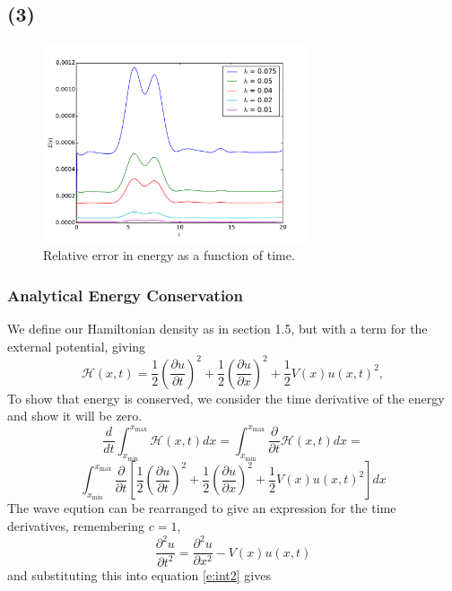 \documentclass[10pt]{article}
\begin{document}
\clearpage
\subsection*{(3)}

\begin{figure}
  \centering
  \includegraphics[width=0.7\textwidth]{2/En.pdf}
  \caption{Relative error in energy as a function of time.}
  \label{f:eerr}
\end{figure}

\subsubsection*{Analytical Energy Conservation}
We define our Hamiltonian density as in section 1.5, but with
a term for the external potential, giving
\begin{equation}
\mathcal{H}(x,t) = \frac{1}{2}\left(\frac{\partial u}{\partial t}\right)^2
+\frac{1}{2}\left(\frac{\partial u}{\partial x}\right)^2 +\frac{1}{2}V(x)u(x,t)^2,
\label{e:ham}
\end{equation}
To show that energy is conserved, we consider the time derivative of the energy and show it
will be zero.
$$ \frac{d}{dt} \int_{x_\text{min}}^{x_\text{max}} \mathcal{H}(x,t)dx =
\int_{x_\text{min}}^{x_\text{max}} \frac{\partial}{\partial t}\mathcal{H}(x,t)dx = $$
\begin{equation}
\int_{x_\text{min}}^{x_\text{max}} \frac{\partial}{\partial t} \left[
\frac{1}{2}\left(\frac{\partial u}{\partial t}\right)^2
+\frac{1}{2}\left(\frac{\partial u}{\partial x}\right)^2 +\frac{1}{2}V(x)u(x,t)^2\right] dx
\label{e:int1}
\end{equation}
The wave eqution can be rearranged to give an expression for the time derivatives, remembering $c=1$,
$$ \frac{\partial^2 u}{\partial t^2} = \frac{\partial^2 u}{\partial x^2} - V(x)u(x,t)$$
and substituting this into equation \ref{e:int2} gives
\begin{equation}
\label{e:int2}
\end{equation}
\end{document}
